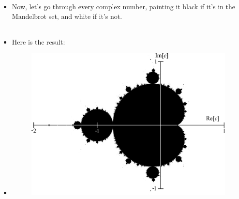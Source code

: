 \documentclass{beamer}
\begin{document}
\frame
{
\begin{itemize}
\item <1->Now, let's go through every complex number, painting it black if it's in the Mandelbrot set, and white if it's not.\\\text{}\\

\item <2->Here is the result: %

\item <3-> \begin{figure}
\centering
\includegraphics[scale=0.15]{presentation_images/mandelbrot_with_axis.png}
\end{figure}

\end{itemize}
}
\end{document}
